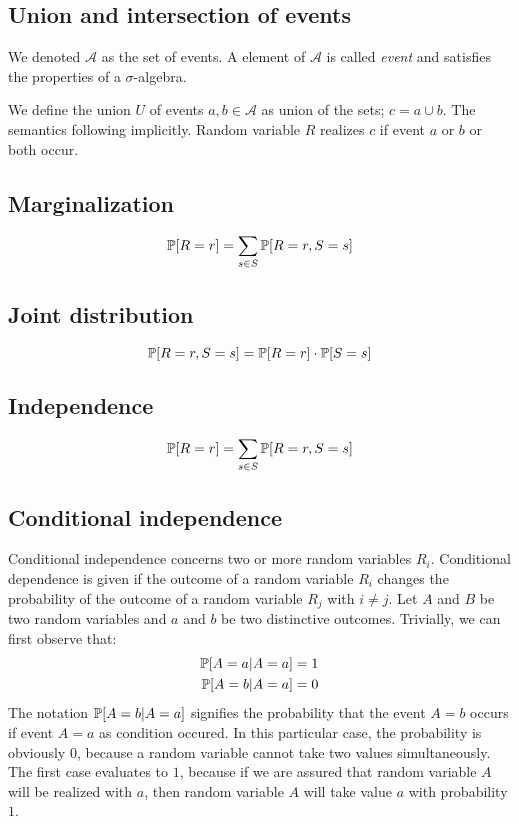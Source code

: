 \subsection{Union and intersection of events}
\label{sec:bp-unin}
%
We denoted $\mathcal A$ as the set of events.
A element of $\mathcal A$ is called \emph{event} and satisfies the
properties of a $\sigma$-algebra.

We define the union $U$ of events $a,b \in \mathcal A$ as union of the sets; $c = a \cup b$.
The semantics following implicitly. Random variable $R$ realizes $c$ if event $a$ or $b$ or both occur.


\subsection{Marginalization}
\label{sec:bp-marginalization}
%
\[ \mathbb P[R=r] = \sum_{s \in S} \mathbb P[R=r, S=s] \]


\subsection{Joint distribution}
\label{sec:bp-joint-distribution}
%
\[ \mathbb P[R=r, S=s] = \mathbb P[R=r] \cdot \mathbb P[S=s] \]


\subsection{Independence}
\label{sec:bp-indep}
%
\[ \mathbb P[R=r] = \sum_{s \in S} \mathbb P[R=r, S=s] \]


\subsection{Conditional independence}
\label{sec:bp-cond-indep}
%
Conditional independence concerns two or more random variables $R_i$.
Conditional dependence is given if the outcome of a random variable $R_i$ changes the probability of the outcome of a random variable $R_j$ with $i \neq j$.
Let $A$ and $B$ be two random variables and $a$ and $b$ be two distinctive outcomes. Trivially, we can first observe that:
\begin{align*}
  \mathbb P[A=a|A=a] &= 1 \\
  \mathbb P[A=b|A=a] &= 0
\end{align*}
The notation $\mathbb P[A=b|A=a]$ signifies the probability that the event $A=b$ occurs if event $A=a$ as condition occured. In this particular case, the probability is obviously $0$, because a random variable cannot take two values simultaneously. The first case evaluates to $1$, because if we are assured that random variable $A$ will be realized with $a$, then random variable $A$ will take value $a$ with probability $1$.

